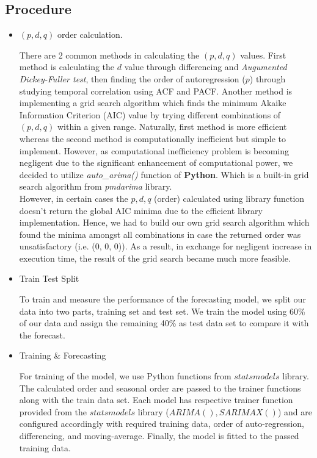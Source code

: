 \documentclass[acmtog]{acmart}
\begin{document}
\subsection{Procedure}
\begin{itemize}
    \item ${(p, d, q)}$ order calculation.
    
There are 2 common methods in calculating the ${(p, d, q)}$ values. First method is calculating the ${d}$ value through differencing and \textit{Augumented Dickey-Fuller test}, then finding the order of autoregression (${p}$) through studying temporal correlation using ACF and PACF. Another method is implementing a grid search algorithm which finds the minimum Akaike Information Criterion (AIC) value by trying different combinations of ${(p, d, q)}$ within a given range. Naturally, first method is more efficient whereas the second method is computationally inefficient but simple to implement. However, as computational inefficiency problem is becoming negligent due to the significant enhancement of computational power, we decided to utilize \textit{auto\_arima()} function of \textbf{Python}. Which is a built-in grid search algorithm from \textit{pmdarima} library. \\

However, in certain cases the ${p, d, q}$ (order) calculated using library function doesn't return the global AIC minima due to the efficient library implementation. Hence, we had to build our own grid search algorithm which found the minima amongst all combinations in case the returned order was unsatisfactory (i.e. (0, 0, 0)). As a result, in exchange for negligent increase in execution time, the result of the grid search became much more feasible. \\

\item Train Test Split

To train and measure the performance of the forecasting model, we split our data into two parts, training set and test set. We train the model using 60\% of our data and assign the remaining 40\% as test data set to compare it with the forecast. \\

\item Training \& Forecasting

For training of the model, we use Python functions from ${statsmodels}$ library. The calculated order and seasonal order are passed to the trainer functions along with the train data set. Each model has respective trainer function provided from the ${statsmodels}$ library (${ARIMA(), SARIMAX()}$) and are configured accordingly with required training data, order of auto-regression, differencing, and moving-average. Finally, the model is fitted to the passed training data. \\


\end{itemize}
\end{document}

